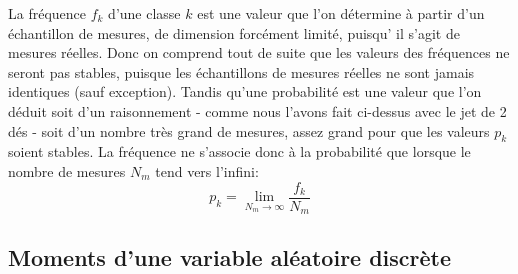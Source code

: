 \documentclass[main.tex]{subfiles}
\begin{document}
La fréquence $f_k$ d'une classe $k$ est une valeur que l'on détermine à partir d'un échantillon de mesures, de dimension forcément limité, puisqu’ il s'agit de mesures réelles. Donc on comprend tout de suite que les valeurs des fréquences ne seront pas stables, puisque les échantillons de mesures réelles ne sont jamais identiques (sauf exception). Tandis qu'une probabilité est une valeur que l'on déduit soit d'un raisonnement - comme nous l'avons fait ci-dessus avec le jet de 2 dés - soit d'un nombre très grand de mesures, assez grand pour que les valeurs $p_k$ soient stables. La fréquence ne s'associe donc à la probabilité que lorsque le nombre de mesures $N_m$ tend vers l'infini:
\begin{equation}
    p_k=\lim_{N_m\rightarrow\infty}\frac{f_k}{N_m}
\end{equation}

\newpage
\subsection{Moments d'une variable aléatoire discrète}\label{par:mdvad}
\end{document}
